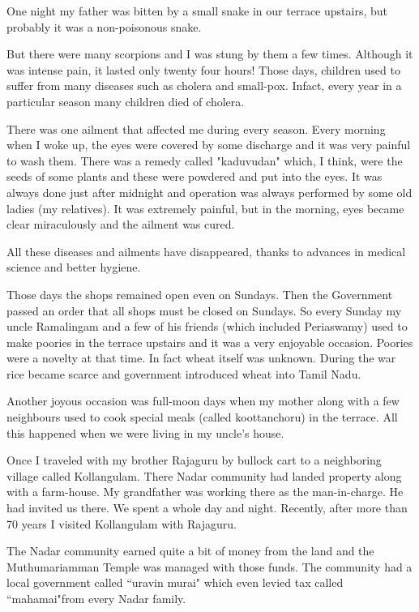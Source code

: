 One night my father was bitten by a small snake in our terrace upstairs, 
but probably it was a non-poisonous snake.

But there were many scorpions and I was stung by them a few times. 
Although it was intense pain, it lasted only twenty four hours! Those 
days, children used to suffer from many diseases such as cholera and 
small-pox. Infact, every year in a particular season many children died 
of cholera. 

There was one ailment that affected me during every season. 
Every morning when I woke up, the eyes were covered by some discharge 
and it was very painful to wash them. There was a remedy called 
"kaduvudan" which, I think, were the seeds of some plants and these were 
powdered and put into the eyes. It was always done just after midnight 
and operation was always performed by some old ladies (my relatives). It 
was extremely painful, but in the morning, eyes became clear 
miraculously and the ailment was cured.

All these diseases and ailments have disappeared, thanks to advances in 
medical science and better hygiene.
 
Those days the shops remained open even on Sundays. Then the Government 
passed an order that all shops must be closed on Sundays. So every 
Sunday my uncle Ramalingam and a few of his friends (which included 
Periaswamy) used to make poories in the terrace upstairs and it was a 
very enjoyable occasion. Poories were a novelty at that time. In fact 
wheat itself was unknown. During the war rice became scarce and 
government introduced wheat into Tamil Nadu.

Another joyous occasion was full-moon days when my mother along with a 
few neighbours used to cook special meals (called koottanchoru) in the 
terrace. All this happened when we were living in my uncle's house.
 
Once I traveled with my brother Rajaguru by bullock cart to a 
neighboring village called Kollangulam. There Nadar community had landed 
property along with a farm-house. My grandfather was working there as 
the man-in-charge. He had invited us there. We spent a whole day and 
night. Recently, after more than 70 years I visited Kollangulam with 
Rajaguru.

The Nadar community earned quite a bit of money from the land and the 
Muthumariamman Temple was managed with those funds. The community had a 
local government called ``uravin murai" which even levied tax called 
``mahamai"from every Nadar family.

